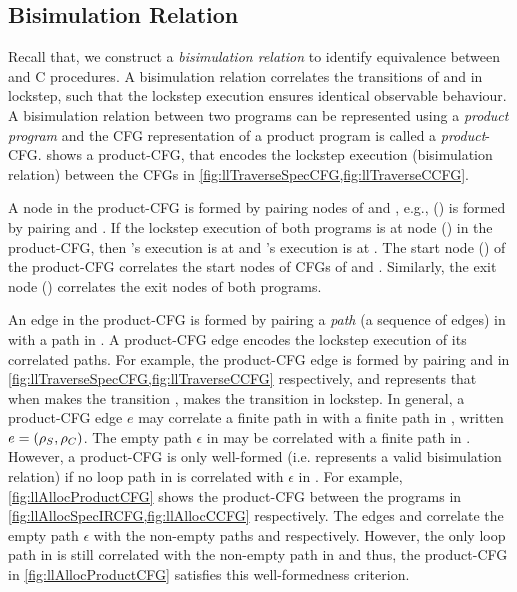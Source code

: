 

\subsection{Bisimulation Relation}
\label{sec:bisim}
Recall that,
we construct a {\em bisimulation relation} to identify equivalence between \SpecL{} and C procedures.
A bisimulation relation correlates the transitions of \sprog{} and \cprog{} in lockstep, such that the
lockstep execution ensures identical observable behaviour.
A bisimulation relation between two programs can be represented using a {\em product program}
\cite{covac} and the CFG representation of a product program is called a {\em product}-CFG.
 shows a product-CFG, that encodes the lockstep execution
(bisimulation relation) between the CFGs in \cref{fig:llTraverseSpecCFG,fig:llTraverseCCFG}.

A node in the product-CFG is formed by pairing nodes of \sprog{} and \cprog{},
e.g., () is formed by pairing  and .
If the lockstep execution of both programs is at node () in the product-CFG,
then \sprog{}'s execution is at  and \cprog{}'s execution is at .
The start node () of the product-CFG correlates the start nodes of CFGs of \sprog{} and \cprog{}.
Similarly, the exit node () correlates the exit nodes of both programs.

An edge in the product-CFG is formed by pairing a {\em path} (a sequence of edges) in \sprog{}
with a path in \cprog{}.
A product-CFG edge encodes the lockstep execution of its correlated paths.
For example, the product-CFG edge  is formed by pairing
 and  in \cref{fig:llTraverseSpecCFG,fig:llTraverseCCFG} respectively,
and represents that when \sprog{} makes the transition , \cprog{} makes the transition 
in lockstep.
In general, a product-CFG edge $e$ may correlate a finite path \sv{\rho} in \sprog{} with a finite path
\cv{\rho} in \cprog{}, written $e=({\tt \rho}_{S},{\tt \rho}_{C})$.
The empty path $\epsilon$ in \sprog{} may be correlated with a finite path in \cprog{}.
However, a product-CFG is only well-formed (i.e. represents a valid bisimulation relation)
if no loop path in \cprog{} is correlated with $\epsilon$ in \sprog{}.
For example, \cref{fig:llAllocProductCFG} shows the product-CFG between the programs
in \cref{fig:llAllocSpecIRCFG,fig:llAllocCCFG} respectively.
The edges  and  correlate the empty path $\epsilon$
with the non-empty paths  and  respectively.
However, the only loop path  in \cprog{} is still correlated with the non-empty path 
in \sprog{} and thus, the product-CFG in \cref{fig:llAllocProductCFG} satisfies this well-formedness criterion.


